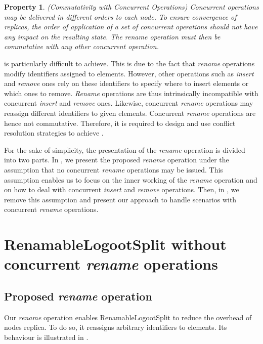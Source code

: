 \documentclass[10pt,journal,compsoc]{IEEEtran}
\newtheorem{property}{Property}
\begin{document}
\begin{property}(Commutativity with Concurrent Operations)
    \label{prop:commutativity}
    Concurrent operations may be delivered in different orders to each node.
    To ensure convergence of replicas, the order of application of a set of concurrent operations should not have any impact on the resulting state.
    The \emph{rename} operation must then be commutative with any other concurrent operation.
\end{property}

 is particularly difficult to achieve.
This is due to the fact that \emph{rename} operations modify identifiers assigned to elements.
However, other operations such as \emph{insert} and \emph{remove} ones rely on these identifiers to specify where to insert elements or which ones to remove.
\emph{Rename} operations are thus intrinsically incompatible with concurrent \emph{insert} and \emph{remove} ones.
Likewise, concurrent \emph{rename} operations may reassign different identifiers to given elements.
Concurrent \emph{rename} operations are hence not commutative.
Therefore, it is required to design and use conflict resolution strategies to achieve .

For the sake of simplicity, the presentation of the \emph{rename} operation is divided into two parts.
In , we present the proposed \emph{rename} operation under the assumption that no concurrent \emph{rename} operations may be issued.
This assumption enables us to focus on the inner working of the \emph{rename} operation and on how to deal with concurrent \emph{insert} and \emph{remove} operations.
Then, in , we remove this assumption and present our approach to handle scenarios with concurrent \emph{rename} operations.

\section{RenamableLogootSplit without concurrent \emph{rename} operations}
\label{sec:centralised-rls}

\subsection{Proposed \emph{rename} operation}

\label{sec:rename-op}

Our \emph{rename} operation enables RenamableLogootSplit to reduce the overhead of nodes replica.
To do so, it reassigns arbitrary identifiers to elements.
Its behaviour is illustrated in .
\end{document}
